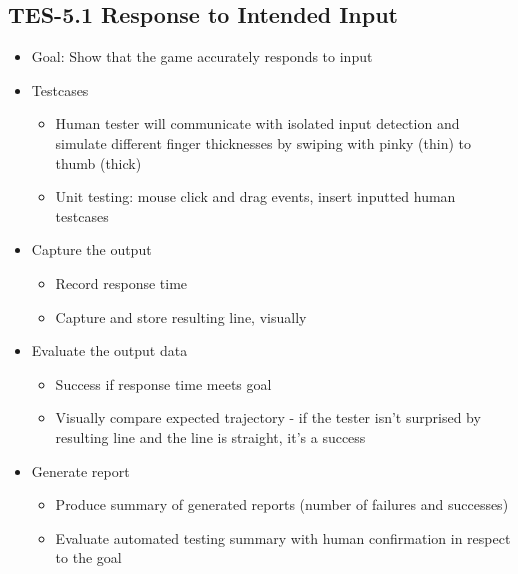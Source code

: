 \subsection{TES-5.1 Response to Intended Input}
\begin{itemize}
\item Goal: Show that the game accurately responds to input 

\item Testcases
\begin{itemize}
\item Human tester will communicate with isolated input detection and simulate different finger thicknesses by swiping with pinky (thin) to thumb (thick)
\item Unit testing: mouse click and drag events, insert inputted human testcases
\end{itemize}

\item Capture the output
\begin{itemize}
\item Record response time
\item Capture and store resulting line, visually
\end{itemize}

\item Evaluate the output data
\begin{itemize}
\item Success if response time meets goal
\item Visually compare expected trajectory - if the tester isn’t surprised by resulting line and the line is straight, it’s a success
\end{itemize}

\item Generate report
\begin{itemize}
\item Produce summary of generated reports (number of failures and successes)
\item Evaluate automated testing summary with human confirmation in respect to the goal
\end{itemize}
\end{itemize}


